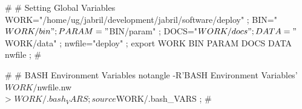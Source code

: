 \documentclass[11pt]{article}
\def\nwendcode{\endtrivlist \endgroup} %
\let\nwdocspar=\par                    %
\begin{document}

\nwenddocs{}\endmoddef
#
# Setting Global Variables
WORK="/home/ug/jabril/development/jabril/software/deploy" ;
BIN="$WORK/bin" ;
PARAM="$BIN/param" ;
DOCS="$WORK/docs" ;
DATA="$WORK/data" ;
nwfile="deploy" ;
export WORK BIN PARAM DOCS DATA nwfile ;
#
\nwendcode{}\nwdocspar

\nwenddocs{}\plusendmoddef
#
# BASH Environment Variables
notangle -R'BASH Environment Variables' $WORK/$nwfile.nw \\
         > $WORK/.bash_VARS ; 
source $WORK/.bash_VARS ;
#
\nwendcode{}
\end{document}
